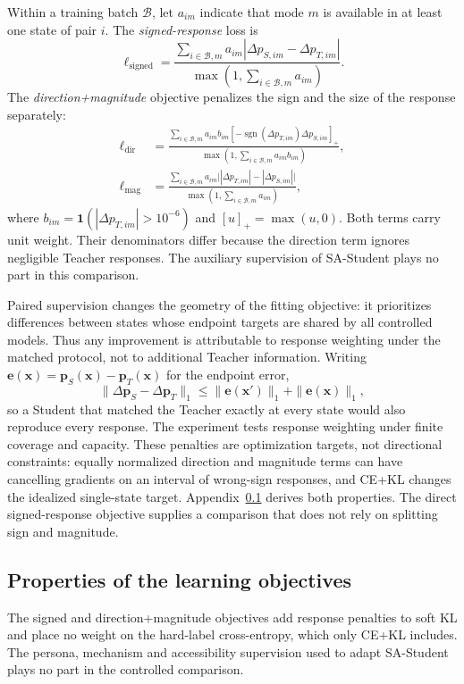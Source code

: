 Within a training batch $\mathcal B$, let $a_{im}$ indicate that mode $m$ is available in at least one state of pair $i$. The \emph{signed-response} loss is
\begin{equation}
\ell_{\mathrm{signed}}=\frac{\sum_{i\in\mathcal B,m}a_{im}|\Delta p_{S,im}-\Delta p_{T,im}|}{\max(1,\sum_{i\in\mathcal B,m}a_{im})}.
\label{eq:signed}
\end{equation}
The \emph{direction+magnitude} objective penalizes the sign and the size of the response separately:
\begin{align}
\ell_{\mathrm{dir}}&=\frac{\sum_{i\in\mathcal B,m}a_{im}b_{im}[-\operatorname{sgn}(\Delta p_{T,im})\Delta p_{S,im}]_+}{\max(1,\sum_{i\in\mathcal B,m}a_{im}b_{im})},\label{eq:direction}\\
\ell_{\mathrm{mag}}&=\frac{\sum_{i\in\mathcal B,m}a_{im}\big||\Delta p_{T,im}|-|\Delta p_{S,im}|\big|}{\max(1,\sum_{i\in\mathcal B,m}a_{im})},\label{eq:magnitude}
\end{align}
where $b_{im}=\mathbf1(|\Delta p_{T,im}|>10^{-6})$ and $[u]_+=\max(u,0)$. Both terms carry unit weight. Their denominators differ because the direction term ignores negligible Teacher responses. The auxiliary supervision of SA-Student plays no part in this comparison.

Paired supervision changes the geometry of the fitting objective: it prioritizes differences between states whose endpoint targets are shared by all controlled models. Thus any improvement is attributable to response weighting under the matched protocol, not to additional Teacher information. Writing $\mathbf e(\mathbf x)=\mathbf p_S(\mathbf x)-\mathbf p_T(\mathbf x)$ for the endpoint error,
\begin{equation}
\|\Delta\mathbf p_S-\Delta\mathbf p_T\|_1\leq\|\mathbf e(\mathbf x')\|_1+\|\mathbf e(\mathbf x)\|_1,
\label{eq:bound}
\end{equation}
so a Student that matched the Teacher exactly at every state would also reproduce every response. The experiment tests response weighting under finite coverage and capacity. These penalties are optimization targets, not directional constraints: equally normalized direction and magnitude terms can have cancelling gradients on an interval of wrong-sign responses, and CE+KL changes the idealized single-state target. Appendix~\ref{sec:loss_diagnostics} derives both properties. The direct signed-response objective supplies a comparison that does not rely on splitting sign and magnitude.

\subsection{Properties of the learning objectives}
\label{sec:loss_diagnostics}
The signed and direction+magnitude objectives add response penalties to soft KL and place no weight on the hard-label cross-entropy, which only CE+KL includes. The persona, mechanism and accessibility supervision used to adapt SA-Student plays no part in the controlled comparison.

